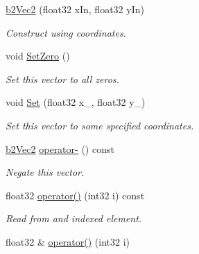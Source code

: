 \begin{DoxyCompactItemize}
\mbox{\label{structb2Vec2_a5d9a42aed33251a53c33a1ff7dd6be43}} 
\hyperlink{structb2Vec2_a5d9a42aed33251a53c33a1ff7dd6be43}{b2\+Vec2} (float32 x\+In, float32 y\+In)
\begin{DoxyCompactList}\small\item\em Construct using coordinates. \end{DoxyCompactList}\item 
\mbox{\label{structb2Vec2_a5c6cbe27cfb29c6dbb29b9a3285b88d0}} 
void \hyperlink{structb2Vec2_a5c6cbe27cfb29c6dbb29b9a3285b88d0}{Set\+Zero} ()
\begin{DoxyCompactList}\small\item\em Set this vector to all zeros. \end{DoxyCompactList}\item 
\mbox{\label{structb2Vec2_a4d61640a645e470a50b451307d8e94c3}} 
void \hyperlink{structb2Vec2_a4d61640a645e470a50b451307d8e94c3}{Set} (float32 x\+\_\+, float32 y\+\_\+)
\begin{DoxyCompactList}\small\item\em Set this vector to some specified coordinates. \end{DoxyCompactList}\item 
\mbox{\label{structb2Vec2_a6cb15514ea571b4ddf73b6829551a127}} 
\hyperlink{structb2Vec2}{b2\+Vec2} \hyperlink{structb2Vec2_a6cb15514ea571b4ddf73b6829551a127}{operator-\/} () const
\begin{DoxyCompactList}\small\item\em Negate this vector. \end{DoxyCompactList}\item 
\mbox{\label{structb2Vec2_a543b5264d17df35448632071f8ae7e4d}} 
float32 \hyperlink{structb2Vec2_a543b5264d17df35448632071f8ae7e4d}{operator()} (int32 i) const
\begin{DoxyCompactList}\small\item\em Read from and indexed element. \end{DoxyCompactList}\item 
\mbox{\label{structb2Vec2_a50b39580d9f479e17b23ce3cb8efbac6}} 
float32 \& \hyperlink{structb2Vec2_a50b39580d9f479e17b23ce3cb8efbac6}{operator()} (int32 i)

\end{DoxyCompactItemize}
